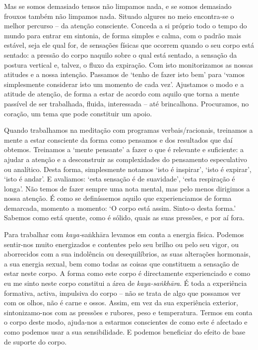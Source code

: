 Mas se somos demasiado tensos não limpamos nada, e se somos demasiado frouxos também não limpamos nada. Situado algures no meio encontra-se o melhor percurso -- da atenção consciente. Conceda a si próprio todo o tempo do mundo para entrar em sintonia, de forma simples e calma, com o padrão mais estável, seja ele qual for, de sensações físicas que ocorrem quando o seu corpo está sentado: a pressão do corpo naquilo sobre o qual está sentado, a sensação da postura vertical e, talvez, o fluxo da expiração. Com isto monitorizamos as nossas atitudes e a nossa intenção. Passamos de `tenho de fazer isto bem' para `vamos simplesmente considerar isto um momento de cada vez'. Ajustamos o modo e a atitude de atenção, de forma a estar de acordo com aquilo que torna a mente passível de ser trabalhada, fluida, interessada -- até brincalhona. Procuramos, no coração, um tema que pode constituir um apoio.

Quando trabalhamos na meditação com programas verbais/racionais, treinamos a mente a estar consciente da forma como pensamos e dos resultados que daí obtemos. Treinamos a `mente pensante' a fazer o que é relevante e suficiente: a ajudar a atenção e a desconstruir as complexidades do pensamento especulativo ou analítico. Desta forma, simplesmente notamos `isto é inspirar', `isto é expirar', `isto é andar'. E avaliamos: `esta sensação é de suavidade', `esta respiração é longa'. Não temos de fazer sempre uma nota mental, mas pelo menos dirigimos a nossa atenção. É como se definíssemos aquilo que experienciamos de forma demarcada, momento a momento: `O corpo está assim. Sinto-o desta forma.' Sabemos como está quente, como é sólido, quais as suas pressões, e por aí fora.

Para trabalhar com \emph{kaya-}saṅkhāra levamos em conta a energia física. Podemos sentir-nos muito energizados e contentes pelo seu brilho ou pelo seu vigor, ou aborrecidos com a sua indolência ou desequilíbrios, as suas alterações hormonais, a sua energia sexual, bem como todas as coisas que constituem a sensação de estar neste corpo. A forma como este corpo é directamente experienciado e como eu me sinto neste corpo constitui a área de \emph{kaya-saṅkhāra}. É toda a experiência formativa, activa, impulsiva do corpo -- não se trata de algo que possamos ver com os olhos, não é carne e ossos. Assim, em vez da sua experiência exterior, sintonizamo-nos com as pressões e rubores, peso e temperatura. Termos em conta o corpo deste modo, ajuda-nos a estarmos conscientes de como este é afectado e como podemos usar a sua sensibilidade. E podemos beneficiar do efeito de base de suporte do corpo.


